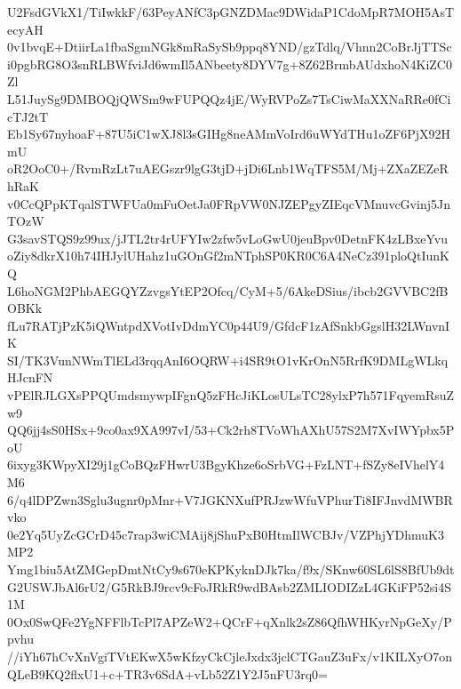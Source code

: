 U2FsdGVkX1/TiIwkkF/63PeyANfC3pGNZDMac9DWidaP1CdoMpR7MOH5AsTecyAH
0v1bvqE+DtiirLa1fbaSgmNGk8mRaSySb9ppq8YND/gzTdlq/Vhnn2CoBrJjTTSc
i0pgbRG8O3snRLBWfviJd6wmIl5ANbeety8DYV7g+8Z62BrmbAUdxhoN4KiZC0Zl
L51JuySg9DMBOQjQWSm9wFUPQQz4jE/WyRVPoZs7TsCiwMaXXNaRRe0fCicTJ2tT
Eb1Sy67nyhoaF+87U5iC1wXJ8l3sGIHg8neAMmVoIrd6uWYdTHu1oZF6PjX92HmU
oR2OoC0+/RvmRzLt7uAEGszr9lgG3tjD+jDi6Lnb1WqTFS5M/Mj+ZXaZEZeRhRaK
v0CcQPpKTqalSTWFUa0mFuOetJa0FRpVW0NJZEPgyZIEqcVMnuvcGvinj5JnTOzW
G3savSTQS9z99ux/jJTL2tr4rUFYIw2zfw5vLoGwU0jeuBpv0DetnFK4zLBxeYvu
oZiy8dkrX10h74IHJylUHahz1uGOnGf2mNTphSP0KR0C6A4NeCz391ploQtIunKQ
L6hoNGM2PhbAEGQYZzvgsYtEP2Ofcq/CyM+5/6AkeDSius/ibcb2GVVBC2fBOBKk
fLu7RATjPzK5iQWntpdXVotIvDdmYC0p44U9/GfdcF1zAfSnkbGgslH32LWnvnIK
SI/TK3VunNWmTlELd3rqqAnI6OQRW+i4SR9tO1vKrOnN5RrfK9DMLgWLkqHJcnFN
vPElRJLGXsPPQUmdsmywpIFgnQ5zFHcJiKLosULsTC28ylxP7h571FqyemRsuZw9
QQ6jj4sS0HSx+9co0ax9XA997vI/53+Ck2rh8TVoWhAXhU57S2M7XvIWYpbx5PoU
6ixyg3KWpyXI29j1gCoBQzFHwrU3BgyKhze6oSrbVG+FzLNT+fSZy8eIVhelY4M6
6/q4lDPZwn3Sglu3ugnr0pMnr+V7JGKNXufPRJzwWfuVPhurTi8IFJnvdMWBRvko
0e2Yq5UyZcGCrD45c7rap3wiCMAij8jShuPxB0HtmIlWCBJv/VZPhjYDhmuK3MP2
Ymg1biu5AtZMGepDmtNtCy9s670eKPKyknDJk7ka/f9x/SKnw60SL6lS8BfUb9dt
G2USWJbAl6rU2/G5RkBJ9rcv9cFoJRkR9wdBAsb2ZMLIODIZzL4GKiFP52si4S1M
0Ox0SwQFe2YgNFFlbTcPl7APZeW2+QCrF+qXnlk2sZ86QfhWHKyrNpGeXy/Ppvhu
//iYh67hCvXnVgiTVtEKwX5wKfzyCkCjleJxdx3jclCTGauZ3uFx/v1KILXyO7on
QLeB9KQ2flxU1+c+TR3v6SdA+vLb52Z1Y2J5nFU3rq0=
